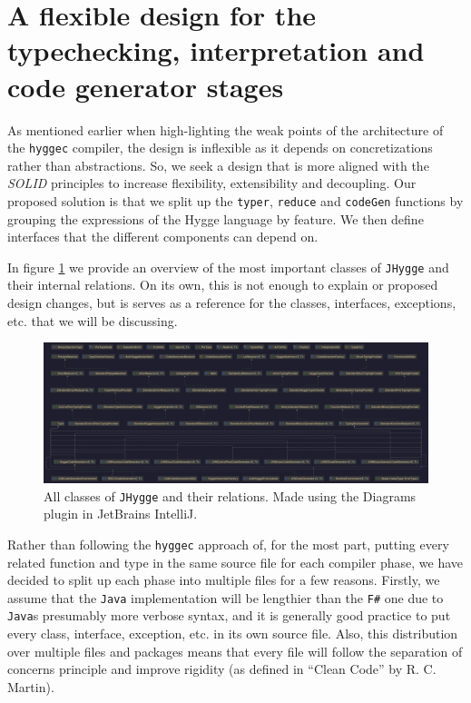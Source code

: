 \section{A flexible design for the typechecking, interpretation and code generator stages}

As mentioned earlier when high-lighting the weak points of the architecture of the \texttt{hyggec} compiler, the design is inflexible as it
depends on concretizations rather than abstractions. So, we seek a design that is more aligned with the \textit{SOLID} principles
to increase flexibility, extensibility and decoupling. Our proposed solution is that we split up the \texttt{typer}, \texttt{reduce}
and \texttt{codeGen} functions by grouping the expressions of the Hygge language by feature. We then define interfaces that the
different components can depend on.

In figure \ref{fig:jhygge_all_classes} we provide an
overview of the most important classes of \texttt{JHygge} and their internal relations. On its own, this is not enough to explain or proposed design
changes, but is serves as a reference for the classes, interfaces, exceptions, etc. that we will be discussing.

\begin{figure}[H]
\centering
\includegraphics[width=\textwidth]{Pictures/Diagrams/jhygge_all_classes.png}
\caption{All classes of \texttt{JHygge} and their relations. Made using the Diagrams plugin in JetBrains IntelliJ.}
\label{fig:jhygge_all_classes}
\end{figure}

Rather than following the \texttt{hyggec} approach of, for the most part, putting every related function and type in the same source file
for each compiler phase, we have decided to split up each phase into multiple files for a few reasons. Firstly, we assume that the \texttt{Java}
implementation will be lengthier than the \texttt{F\#} one due to \texttt{Java}s presumably more verbose syntax, and it is generally good
practice to put every class, interface, exception, etc. in its own source file. Also, this distribution over multiple files and packages
means that every file will follow the separation of concerns principle and improve rigidity (as defined in ``Clean Code'' by R. C. Martin)\cite{clean_code}. 

